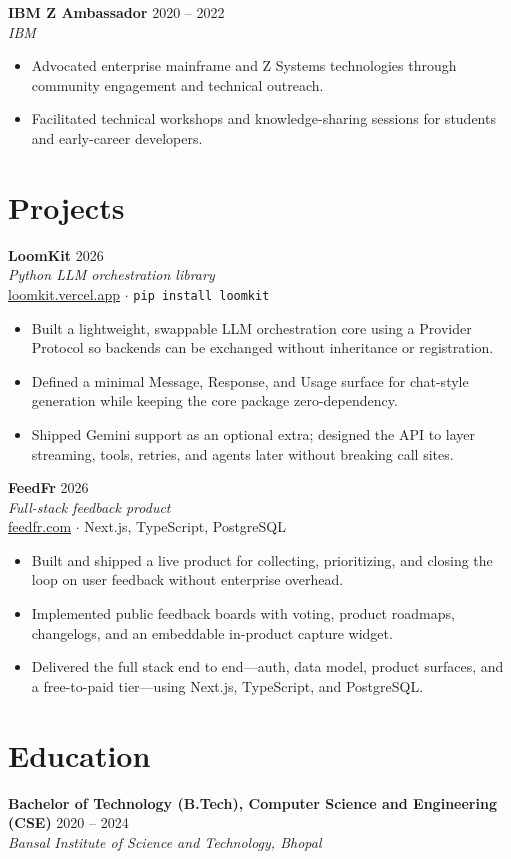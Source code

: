 \documentclass[10.5pt,a4paper]{article}
\newcommand{\roleline}[3]{%
  \textbf{#1} \hfill #3\\[-0.5pt]
  \textit{#2}\\[2pt]
}
\begin{document}
\vspace{5pt}
\roleline{IBM Z Ambassador}{IBM}{2020 -- 2022}
\begin{itemize}
  \item Advocated enterprise mainframe and Z Systems technologies through community engagement and technical outreach.
  \item Facilitated technical workshops and knowledge-sharing sessions for students and early-career developers.
\end{itemize}

\section{Projects}

\roleline{LoomKit}{Python LLM orchestration library}{2026}
\href{https://loomkit.vercel.app/}{loomkit.vercel.app}
$\cdot$ \texttt{pip install loomkit}
\begin{itemize}
  \item Built a lightweight, swappable LLM orchestration core using a Provider Protocol so backends can be exchanged without inheritance or registration.
  \item Defined a minimal Message, Response, and Usage surface for chat-style generation while keeping the core package zero-dependency.
  \item Shipped Gemini support as an optional extra; designed the API to layer streaming, tools, retries, and agents later without breaking call sites.
\end{itemize}

\vspace{5pt}
\roleline{FeedFr}{Full-stack feedback product}{2026}
\href{https://feedfr.com}{feedfr.com}
$\cdot$ Next.js, TypeScript, PostgreSQL
\begin{itemize}
  \item Built and shipped a live product for collecting, prioritizing, and closing the loop on user feedback without enterprise overhead.
  \item Implemented public feedback boards with voting, product roadmaps, changelogs, and an embeddable in-product capture widget.
  \item Delivered the full stack end to end---auth, data model, product surfaces, and a free-to-paid tier---using Next.js, TypeScript, and PostgreSQL.
\end{itemize}

\section{Education}

\textbf{Bachelor of Technology (B.Tech), Computer Science and Engineering (CSE)} \hfill 2020 -- 2024\\
\textit{Bansal Institute of Science and Technology, Bhopal}
\end{document}
